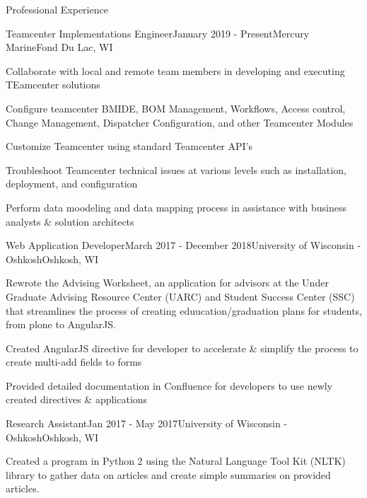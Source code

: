 \documentclass{resume} %
\begin{document}
\begin{rSection}{Professional Experience}

    \begin{rSubsection}{Teamcenter Implementations Engineer}{January 2019 - Present}{Mercury Marine}{Fond Du Lac, WI}
        \item Collaborate with local and remote team members in developing and executing TEamcenter solutions
        \item Configure teamcenter BMIDE, BOM Management, Workflows, Access control, Change Management, Dispatcher Configuration, and other Teamcenter Modules
        \item Customize Teamcenter using standard Teamcenter API's
        \item Troubleshoot Teamcenter technical issues at various levels such as installation, deployment, and configuration
        \item Perform data moodeling and data mapping process in assistance with business analysts \& solution architects
    \end{rSubsection}

    \begin{rSubsection}{Web Application Developer}{March 2017 - December 2018}{University of Wisconsin - Oshkosh}{Oshkosh, WI}
        \item Rewrote the Advising Worksheet, an application for advisors at the Under Graduate Advising Resource Center (UARC) and 
            Student Success Center (SSC) that streamlines the process of creating eduucation/graduation plans for students, from 
            plone to AngularJS. 
        \item Created AngularJS directive for developer to accelerate \& simplify the process to create multi-add fields to forms
        \item Provided detailed documentation in Confluence for developers to use newly created directives \& applications
    \end{rSubsection}

    \begin{rSubsection}{Research Assistant}{Jan 2017 - May 2017}{University of Wisconsin - Oshkosh}{Oshkosh, WI}
        \item Created a program in Python 2 using the Natural Language Tool Kit (NLTK) library to gather data on articles and 
            create simple summaries on provided articles.
    \end{rSubsection}

\end{rSection}
\end{document}
